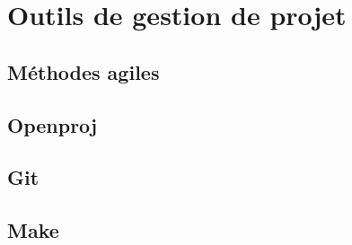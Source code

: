 \section{Outils de gestion de projet}

\subsection{Méthodes agiles}



\subsection{Openproj}

\subsection{Git}

\subsection{Make}


